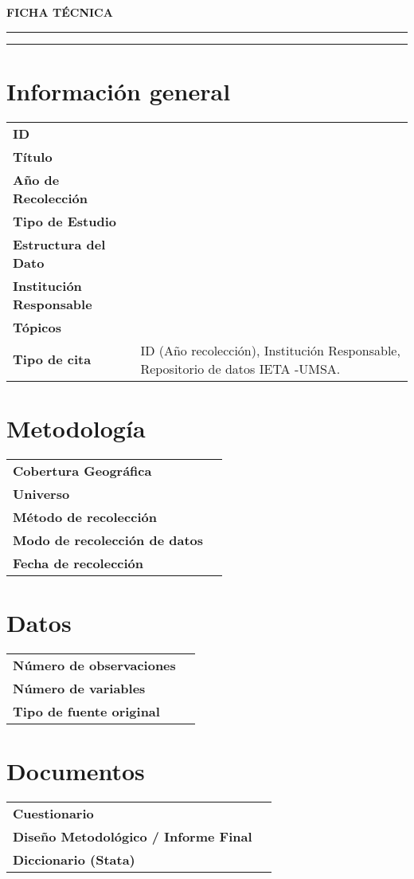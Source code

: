 \documentclass{article}
\begin{document}
\begin{center}
{\LARGE \textbf{FICHA TÉCNICA}}
\end{center}
\hrule
\hrule
\section*{Información general}

\begin{flushleft}
\begin{tabular}{|l|p{8cm}|}
\hline
\textbf{ID} & \\
\textbf{Título} & \\
\textbf{Año de Recolección} & \\
\textbf{Tipo de Estudio} & \\
\textbf{Estructura del Dato} &  \\
\textbf{Institución Responsable} &  \\
\textbf{Tópicos} &  \\
\textbf{Tipo de cita} & ID (Año recolección), Institución Responsable, Repositorio de datos IETA -UMSA.\\
\hline
\end{tabular}
\end{flushleft}

\section*{Metodología}

\begin{flushleft}
\begin{tabular}{|l|p{8cm}|}
\hline
\textbf{Cobertura Geográfica} & \\
\textbf{Universo} & \\
\textbf{Método de recolección} & \\
\textbf{Modo de recolección de datos} & \\
\textbf{Fecha de recolección} & \\
\hline
\end{tabular}
\end{flushleft}

\section*{Datos}

\begin{flushleft}
\begin{tabular}{|l|p{8cm}|}
\hline
\textbf{Número de observaciones} & \\
\textbf{Número de variables} & \\
\textbf{Tipo de fuente original} & \\
\hline
\end{tabular}
\end{flushleft}

\section*{Documentos}

\begin{flushleft}
\begin{tabular}{|l|p{8cm}|}
\hline
\textbf{Cuestionario} & \\
\textbf{Diseño Metodológico / Informe Final} & \\
\textbf{Diccionario (Stata)} & \\
\hline
\end{tabular}
\end{flushleft}
\end{document}
